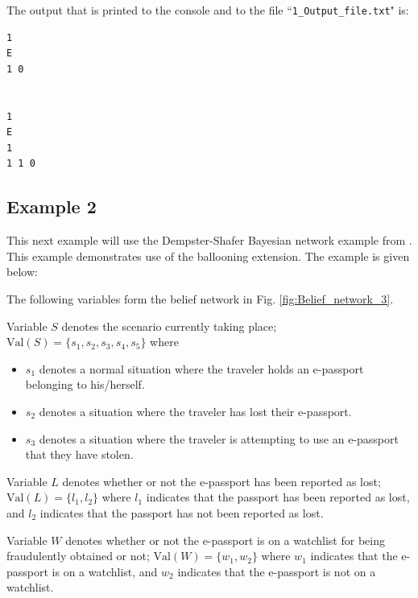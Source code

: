 \documentclass{article}
\begin{document}
The output that is printed to the console and to the file ``\texttt{1\_Output\_file.txt}" is:
\begin{verbatim}
1
E 
1 0 


1
E 
1
1 1 0 
\end{verbatim}



\subsection{Example 2}\label{sec:Example_2}

This next example will use the Dempster-Shafer Bayesian network example from \cite[sections 8.6, 8.7, 8.8]{[EastwoodCIDS2015]}. This example demonstrates use of the ballooning extension. The example is given below:

The following variables form the belief network in Fig. \ref{fig:Belief_network_3}.

Variable \(S\) denotes the scenario currently taking place; 
\(\text{Val}(S) = \{s_1, s_2, s_3, s_4, s_5\}\) where
\begin{itemize}
\item \(s_1\) denotes a normal situation where the traveler holds an e-passport belonging to his/herself. 
\item \(s_2\) denotes a situation where the traveler has lost their e-passport.
\item \(s_3\) denotes a situation where the traveler is attempting to use an e-passport that they have stolen.
\end{itemize}

 Variable \(L\) denotes whether or not the e-passport has been reported as lost;
$\text{Val}(L) = \{l_1, l_2\}$ where
 \(l_1\) indicates that the passport has been reported as lost, and
 \(l_2\) indicates that the passport has not been reported as lost.

 Variable \(W\) denotes whether or not the e-passport is on a watchlist for being fraudulently obtained or not;
$\text{Val}(W) = \{w_1, w_2\}$ where
\(w_1\) indicates that the e-passport is on a watchlist, and
 \(w_2\) indicates that the e-passport is not on a watchlist.
\end{document}
